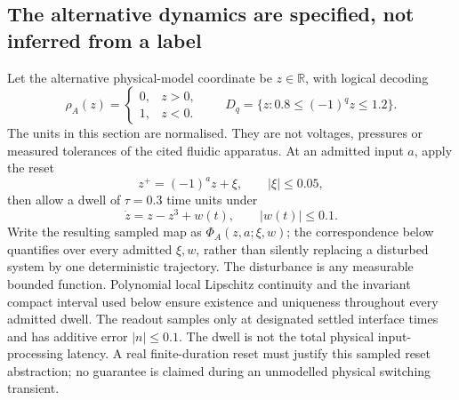 \documentclass[11pt,a4paper]{article}
\theoremstyle{definition}
\theoremstyle{remark}
\newcommand{\R}{\mathbb{R}}
\begin{document}
\subsection{The alternative dynamics are specified, not inferred from a label}
Let the alternative physical-model coordinate be $z\in\R$, with logical decoding
\[
 \rho_A(z)=\begin{cases}0,&z>0,\\1,&z<0.\end{cases}
 \qquad
 D_q=\{z:0.8\leq(-1)^qz\leq1.2\}.
\]
The units in this section are normalised. They are not voltages, pressures or measured tolerances of the cited fluidic apparatus. At an admitted input $a$, apply the reset
\begin{equation}\label{eq:reset}
 z^+=(-1)^a z+\xi,\qquad |\xi|\leq0.05,
\end{equation}
then allow a dwell of $\tau=0.3$ time units under
\begin{equation}\label{eq:bistable}
 \dot z=z-z^3+w(t),\qquad |w(t)|\leq0.1.
\end{equation}
Write the resulting sampled map as $\Phi_A(z,a;\xi,w)$; the correspondence below quantifies over every admitted $\xi,w$, rather than silently replacing a disturbed system by one deterministic trajectory. The disturbance is any measurable bounded function. Polynomial local Lipschitz continuity and the invariant compact interval used below ensure existence and uniqueness throughout every admitted dwell. The readout samples only at designated settled interface times and has additive error $|n|\leq0.1$. The dwell is not the total physical input-processing latency. A real finite-duration reset must justify this sampled reset abstraction; no guarantee is claimed during an unmodelled physical switching transient.
\end{document}
